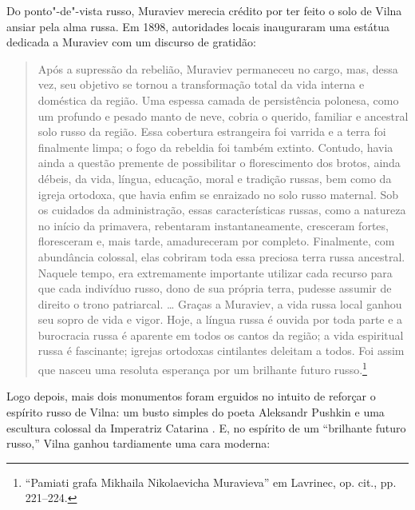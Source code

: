 Do ponto"-de"-vista russo, Muraviev merecia crédito por ter feito o solo
de Vilna ansiar pela alma russa. Em 1898, autoridades locais inauguraram
uma estátua dedicada a Muraviev com um discurso de gratidão:

\begin{quote}
Após a supressão da rebelião, Muraviev permaneceu no cargo, mas, dessa
vez, seu objetivo se tornou a transformação total da vida interna e
doméstica da região. Uma espessa camada de persistência polonesa, como
um profundo e pesado manto de neve, cobria o querido, familiar e
ancestral solo russo da região. Essa cobertura estrangeira foi varrida e
a terra foi finalmente limpa; o fogo da rebeldia foi também extinto.
Contudo, havia ainda a questão premente de possibilitar o florescimento
dos brotos, ainda débeis, da vida, língua, educação, moral e tradição
russas, bem como da igreja ortodoxa, que havia enfim se enraizado no
solo russo maternal. Sob os cuidados da administração, essas
características russas, como a natureza no início da primavera,
rebentaram instantaneamente, cresceram fortes, floresceram e, mais
tarde, amadureceram por completo. Finalmente, com abundância colossal,
elas cobriram toda essa preciosa terra russa ancestral. Naquele tempo,
era extremamente importante utilizar cada recurso para que cada
indivíduo russo, dono de sua própria terra, pudesse assumir de direito o
trono patriarcal. \ldots{} Graças a Muraviev, a vida russa local ganhou
seu sopro de vida e vigor. Hoje, a língua russa é ouvida por toda parte
e a burocracia russa é aparente em todos os cantos da região; a vida
espiritual russa é fascinante; igrejas ortodoxas cintilantes deleitam a
todos. Foi assim que nasceu uma resoluta esperança por um brilhante
futuro russo.\footnote{``Pamiati grafa Mikhaila Nikolaevicha Muravieva''
  em Lavrinec, op. cit., pp. 221--224.}
\end{quote}

Logo depois, mais dois monumentos foram erguidos no intuito de reforçar
o espírito russo de Vilna: um busto simples do poeta Aleksandr Pushkin e
uma escultura colossal da Imperatriz Catarina . E, no espírito de um
``brilhante futuro russo,'' Vilna ganhou tardiamente uma cara moderna:

